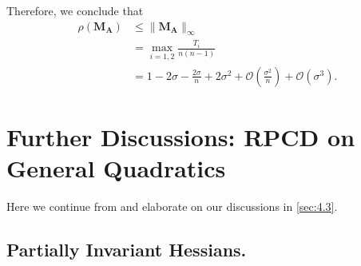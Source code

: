 \documentclass{article}
\theoremstyle{plain}
\theoremstyle{definition}
\theoremstyle{remark}
\def\bigopen#1{\left(#1\right)}
\def\mA{{\bm{A}}}
\def\mM{{\bm{M}}}
\def\gO{{\mathcal{O}}}
\begin{document}
Therefore, we conclude that 
\begin{align*}
    \rho(\mM_{\mA}) &\le \|\mM_{\mA}\|_{\infty} \\
    &= \max_{i=1,2} \frac{T_i}{n(n-1)} \\
    &= 1 - 2 \sigma - \frac{2 \sigma}{n} + 2 \sigma^2 + \gO \bigopen{\frac{\sigma^2}{n}} + \gO \bigopen{\sigma^3}.
\end{align*}
\newpage

\section{Further Discussions: RPCD on General Quadratics}
\label{sec:e}

Here we continue from and elaborate on our discussions in \cref{sec:4.3}.

\subsection{Partially Invariant Hessians.}
\label{sec:e.1}
\end{document}
